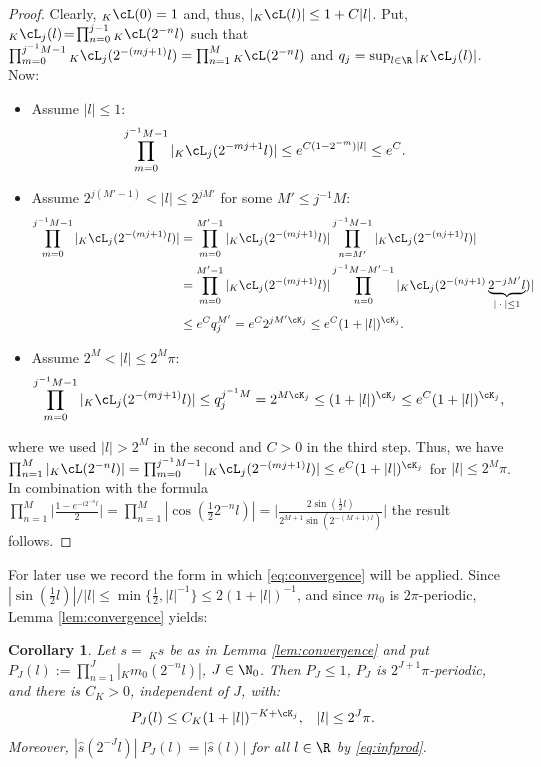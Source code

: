 \documentclass[a4paper, 11pt]{article}
\DeclareMathOperator{\1}{\mathds{1}}
\newtheorem{cor}[thm]{Corollary}
\begin{document}
\begin{proof}
Clearly, $_{K}\cL(0)=1$ and, thus, $|{}_{K}\cL(l)|\leq 1+C|l|$. Put, ${}_{K}\cL_{j}(l) \!=\! \prod_{n=0}^{j-1}{}_{K}\cL(2^{-n}l)$ such that $\prod_{m=0}^{j^{-1}M-1}{}_{K}\cL_{j}(2^{-(mj+1)}l) = \prod_{n=1}^{M}{}_{K}\cL(2^{-n}l)$ and $q_{j} = \sup_{l\in\R}|{}_{K}\cL_{j}(l)|$. Now:
\begin{itemize}
	\item[1.] Assume $|l|\leq1$:
	\begin{align*}
	\prod_{m=0}^{j^{-1}M-1}|{}_{K}\cL_{j}(2^{-mj+1}l)| & \leq e^{C(1-2^{-m})|l|}\leq e^{C}.
	\end{align*}
	\item[2.] Assume $2^{j(M'-1)}<|l|\leq2^{jM'}$ for some $M'\leq j^{-1}M$:
	\begin{align*}
	\prod_{m=0}^{j^{-1}M-1}|{}_{K}\cL_{j}(2^{-(mj+1)}l)| & = \prod_{m=0}^{M'-1}|{}_{K}\cL_{j}(2^{-(mj+1)}l)|\prod_{n=M'}^{j^{-1}M-1}|{}_{K}\cL_{j}(2^{-(nj+1)}l)| \\
	& = \prod_{m=0}^{M'-1}|{}_{K}\cL_{j}(2^{-(mj+1)}l)|\prod_{n=0}^{j^{-1}M-M'-1}|{}_{K}\cL_{j}(2^{-(nj+1)}\underbrace{2^{-jM'}l}_{|\!\ \cdot\!\ |\leq1})| \\
	& \leq e^{C} q_{j}^{M'} = e^{C}2^{jM'\cK_{j}} \leq e^{C}(1+|l|)^{\cK_{j}}.
	\end{align*}
	\item[3.] Assume $2^{M}<|l|\leq2^{M}\pi$:
	\begin{align*}
	\prod_{m=0}^{j^{-1}M-1}|{}_{K}\cL_{j}(2^{-(mj+1)}l)| & \leq q_{j}^{j^{-1}M} = 2^{M\cK_{j}}\leq (1+|l|)^{\cK_{j}}\leq e^{C}(1+|l|)^{\cK_{j}},
	\end{align*}
\end{itemize}
where we used $|l|>2^{M}$ in the second and $C>0$ in the third step.
Thus, we have $\prod_{n=1}^{M}|{}_{K}\cL(2^{-n}l)| = \prod_{m=0}^{j^{-1}M-1}|{}_{K}\cL_{j}(2^{-(mj+1)}l)| \leq e^{C}(1+|l|)^{\cK_{j}}$ for $|l|\leq 2^{M}\pi$. In combination with the formula $\prod_{n=1}^{M}\Big|\tfrac{1-e^{-i2^{-n}l}}{2}\Big| = \prod_{n=1}^{M}|\cos(\tfrac{1}{2}2^{-n}l)| = \Big|\tfrac{2\sin(\frac{1}{2}l)}{2^{M+1}\sin(2^{-(M+1)l})}\Big|$ the result follows.
\end{proof}
For later use we record the form in which \eqref{eq:convergence} will be applied. Since $|\sin(\tfrac{1}{2}l)|/|l|\leq\min\{\tfrac{1}{2},|l|^{-1}\}\leq2(1+|l|)^{-1}$, and since $m_{0}$ is $2\pi$-periodic, Lemma \ref{lem:convergence} yields:
\begin{cor}
\label{cor:convergence}
Let $s=\!\ _{K}s$ be as in Lemma \ref{lem:convergence} and put $P_{J}(l):=\prod_{n=1}^{J}|{}_{K}m_{0}(2^{-n}l)|$, $J\in\N_{0}$. Then $P_{J}\leq1$, $P_{J}$ is $2^{J+1}\pi$-periodic, and there is $C_{K}>0$, \emph{independent of $J$}, with:
\begin{align}
\label{eq:convergencecor}
P_{J}(l) & \leq C_{K}(1+|l|)^{-K+\cK_{j}}, & |l| & \leq2^{J}\pi.
\end{align}
Moreover, $|\hat{s}(2^{-J}l)|\!\ P_{J}(l) = |\hat{s}(l)|$ for all $l\in\R$ by \eqref{eq:infprod}.
\end{cor}
\end{document}
